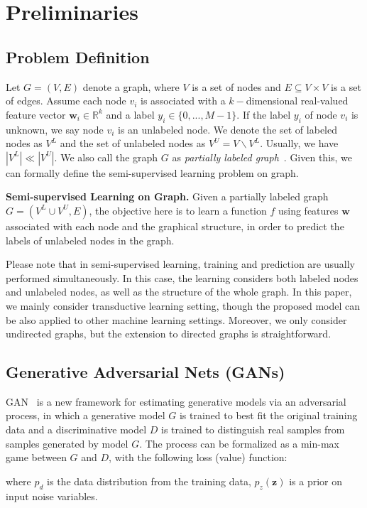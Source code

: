 \section{Preliminaries}
\label{sec:def}
\subsection{Problem Definition}
    Let $G=(V,E)$ denote a graph, where $V$ is a set of nodes and $E \subseteq V \times V $ is a set of edges. Assume each node $v_i$ is associated with a $k-$dimensional real-valued feature vector $\mathbf{w}_i \in \mathbb{R}^k$ and a label $y_i \in \{0,...,M-1\}$.
    If the label $y_i$ of node $v_i$ is unknown, we say node $v_i$ is an unlabeled node. We denote the set of labeled nodes as $V^L$ and the set of unlabeled nodes as $V^U=V\backslash V^L$. Usually, we have $|V^L| \ll |V^U|$. We also call the graph $G$ as \textit{partially labeled graph}~\cite{Tang:11PKDD}.
    Given this, we can formally define the semi-supervised learning problem on graph.

\begin{definition}\textbf{Semi-supervised Learning on Graph.}
	Given a partially labeled graph $G=(V^L\cup V^U, E)$, the objective here is to learn a function $f$ using features $\mathbf{w}$ associated with each node and the graphical structure, in order to predict the labels of unlabeled nodes in the graph.
\end{definition}
 
 Please note that in semi-supervised learning, training and prediction are usually performed simultaneously. In this case, the learning considers both labeled nodes and unlabeled nodes, as well as the structure of the whole graph.
    In this paper, we mainly consider transductive learning setting, though the proposed model can be also applied to other machine learning settings. 
    Moreover, we only consider undirected graphs, but the extension to directed graphs is straightforward.

\subsection{Generative Adversarial Nets (GANs)}

GAN~\cite{goodfellow2014generative} is a new framework for estimating generative models via an adversarial process, in which a generative model $G$ is trained to best fit the original training data and a discriminative model $D$ is trained to distinguish real samples from samples generated by model $G$.
The process can be formalized as a min-max game between $G$ and $D$, with the following loss (value) function:


\noindent where $p_{d}$ is the data distribution from the training data, $p_z(\mathbf{z})$ is a prior on input noise variables.





